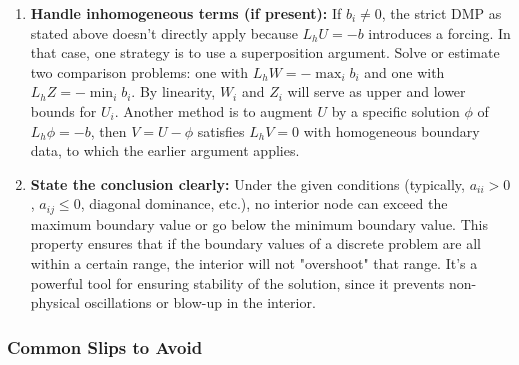 \documentclass[a4paper,11pt]{article}
\begin{document}
\begin{enumerate}
    \item \textbf{Handle inhomogeneous terms (if present):} If $b_i \neq 0$, the strict DMP as stated above doesn't directly apply because $L_h U = -b$ introduces a forcing. In that case, one strategy is to use a superposition argument. Solve or estimate two comparison problems: one with $L_h W = -\max_i b_i$ and one with $L_h Z = -\min_i b_i$. By linearity, $W_i$ and $Z_i$ will serve as upper and lower bounds for $U_i$. Another method is to augment $U$ by a specific solution $\phi$ of $L_h \phi = -b$, then $V = U - \phi$ satisfies $L_h V = 0$ with homogeneous boundary data, to which the earlier argument applies.

    \item \textbf{State the conclusion clearly:} Under the given conditions (typically, $a_{ii}>0$, $a_{ij}\le0$, diagonal dominance, etc.), no interior node can exceed the maximum boundary value or go below the minimum boundary value. This property ensures that if the boundary values of a discrete problem are all within a certain range, the interior will not "overshoot" that range. It's a powerful tool for ensuring stability of the solution, since it prevents non-physical oscillations or blow-up in the interior.
\end{enumerate}

\subsubsection{Common Slips to Avoid}
\end{document}
